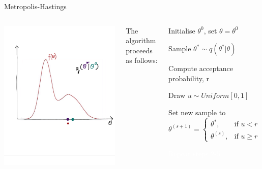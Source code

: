 \documentclass[compress]{beamer}
\begin{document}
\begin{frame}[label=sec-7-12]{Metropolis-Hastings}
\begin{columns}[c] 
\includegraphics[width=1\linewidth]{MH5}

The algorithm proceeds as follows:\\
\begin{enumerate}
\item Initialise $\theta^{0}$, set $\theta = \theta^{0}$
\item Sample $\theta^* \sim q(\theta^*|\theta)$
\item Compute acceptance probability, r
\item Draw $u \sim Uniform[0,1]$
\item Set new sample to 
\[
 \theta^{(s+1)} = 
\begin{cases}
    \theta^*, & \text{if } u < r\\
    \theta^{(s)}, & \text{if } u \geqslant r
\end{cases}
\]
\textcolor{white}{
\item[\color{white}] Repeat steps 2-5
}
\end{enumerate}
\end{columns}
\end{frame}
\end{document}
